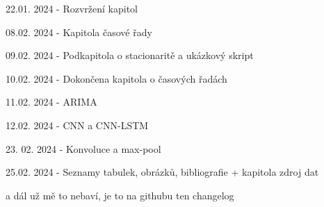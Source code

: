 \documentclass[FM,BP,fonts]{tulthesis}
\begin{document}
22.01. 2024 - Rozvržení kapitol

08.02. 2024 - Kapitola časové řady

09.02. 2024 - Podkapitola o stacionaritě a ukázkový skript

10.02. 2024 - Dokončena kapitola o časových řadách

11.02. 2024 - ARIMA 

12.02. 2024 - CNN a CNN-LSTM 

23. 02. 2024 - Konvoluce a max-pool

25.02. 2024 - Seznamy tabulek, obrázků, bibliografie + kapitola zdroj dat

a dál už mě to nebaví, je to na githubu ten changelog


\printbibliography[title={Použitá literatura}] %

\end{document}

